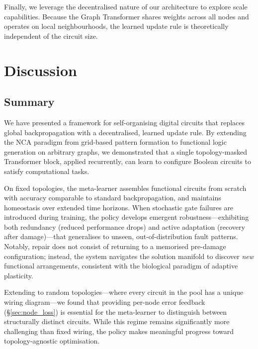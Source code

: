Finally, we leverage the decentralised nature of our architecture to explore scale capabilities. Because the Graph Transformer shares weights across all nodes and operates on local neighbourhoods, the learned update rule is theoretically independent of the circuit size. 


\section{Discussion}

\subsection*{Summary}

We have presented a framework for self-organising digital circuits that replaces global backpropagation with a decentralised, learned update rule. By extending the NCA paradigm from grid-based pattern formation to functional logic generation on arbitrary graphs, we demonstrated that a single topology-masked Transformer block, applied recurrently, can learn to configure Boolean circuits to satisfy computational tasks.

On fixed topologies, the meta-learner assembles functional circuits from scratch with accuracy comparable to standard backpropagation, and maintains homeostasis over extended time horizons. When stochastic gate failures are introduced during training, the policy develops emergent robustness---exhibiting both redundancy (reduced performance drops) and active adaptation (recovery after damage)---that generalises to unseen, out-of-distribution fault patterns. Notably, repair does not consist of returning to a memorised pre-damage configuration; instead, the system navigates the solution manifold to discover \textit{new} functional arrangements, consistent with the biological paradigm of adaptive plasticity.

Extending to random topologies---where every circuit in the pool has a unique wiring diagram---we found that providing per-node error feedback (\S\ref{sec:node_loss}) is essential for the meta-learner to distinguish between structurally distinct circuits. While this regime remains significantly more challenging than fixed wiring, the policy makes meaningful progress toward topology-agnostic optimisation. 

